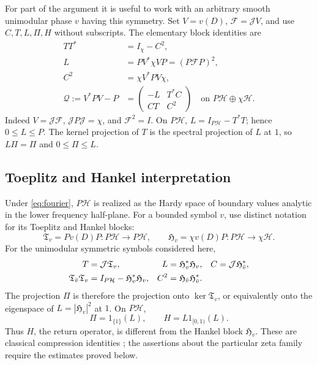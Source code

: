\documentclass[11pt]{article}
\numberwithin{equation}{section}
\theoremstyle{definition}
\theoremstyle{remark}
\newcommand{\HH}{\mathcal H}
\newcommand{\Id}{I}
\newcommand{\J}{\mathcal J}
\newcommand{\Fcal}{\mathcal F}
\newcommand{\Qcal}{\mathcal Q}
\begin{document}
For part of the argument it is useful to work with an arbitrary smooth
unimodular phase \(v\) having this symmetry. Set \(V=v(D)\),
\(\Fcal=\J V\), and use \(C,T,L,\Pi,H\) without subscripts.
The elementary block identities are
\begin{align}
TT^*&=\Id_\chi-C^2,\label{eq:tt}\\
L&=P V^*\chi V P=(P\Fcal P)^2,\label{eq:Lfactor}\\
C^2&=\chi V^*PV\chi,\label{eq:Cfactor}\\
\Qcal:=V^*PV-P
&=\begin{pmatrix}-L&T^*C\\ CT&C^2\end{pmatrix}
\quad\text{on }P\HH\oplus\chi\HH.\label{eq:Qblocks}
\end{align}
Indeed \(V=\J\Fcal\), \(\J P\J=\chi\), and \(\Fcal^2=\Id\).
On \(P\HH\), \(L=\Id_{P\HH}-T^*T\); hence \(0\le L\le P\).
The kernel projection of \(T\) is the spectral projection of \(L\)
at \(1\), so \(L\Pi=\Pi\) and \(0\le\Pi\le L\).

\subsection{Toeplitz and Hankel interpretation}\label{sec:dictionary}

Under \eqref{eq:fourier}, \(P\HH\) is realized as the Hardy space of
boundary values analytic in the lower frequency half-plane. For a bounded
symbol \(v\), use distinct notation for its Toeplitz and Hankel blocks:
\[
\mathfrak T_v=Pv(D)P:P\HH\to P\HH,\qquad
\mathfrak H_v=\chi v(D)P:P\HH\to\chi\HH.
\]
For the unimodular symmetric symbols considered here,
\begin{align}
T&=\J\mathfrak T_v,&
L&=\mathfrak H_v^*\mathfrak H_v,&
C&=\J\mathfrak H_{\bar v}^*,\label{eq:dictionary}\\
\mathfrak T_{\bar v}\mathfrak T_v
&=\Id_{P\HH}-\mathfrak H_v^*\mathfrak H_v,&
C^2&=\mathfrak H_{\bar v}\mathfrak H_{\bar v}^*.\notag
\end{align}
The projection \(\Pi\) is therefore the projection onto
\(\ker\mathfrak T_v\), or equivalently onto the eigenspace of
\(L=|\mathfrak H_v|^2\) at \(1\). On \(P\HH\),
\[
\Pi=1_{\{1\}}(L),\qquad H=L1_{[0,1)}(L).
\]
Thus \(H\), the return operator, is different from the Hankel block
\(\mathfrak H_v\). These are classical compression identities
\cite{Peller}; the assertions about the particular zeta family require
the estimates proved below.
\end{document}
